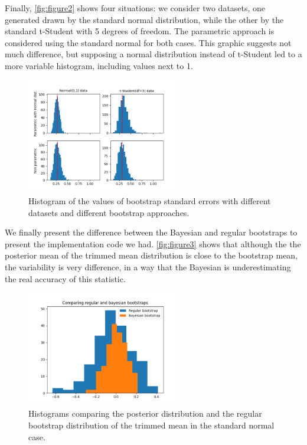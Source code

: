 \documentclass[a4paper,10pt, notitlepage]{report}
\begin{document}
Finally, \autoref{fig:figure2} shows four situations: we consider two
datasets, one generated drawn by the standard normal distribution, while the
other by the standard t-Student with 5 degrees of freedom. The parametric
approach is considered using the standard normal for both cases. This graphic
suggests not much difference, but supposing a normal distribution instead of
t-Student led to a more variable histogram, including values next to 1.

\begin{figure}[htb]
  \centering
  \includegraphics[width=0.6\textwidth]{parametric_bootstrap.png}
  \caption{\label{fig:figure2}Histogram of the values of bootstrap standard errors
  with different datasets and different bootstrap approaches.}
\end{figure}

We finally present the difference between the Bayesian and regular bootstraps
to present the implementation code we had. \autoref{fig:figure3} shows that
although the the posterior mean of the trimmed mean distribution is close to
the bootstrap mean, the variability is very difference, in a way that the
Bayesian is underestimating the real accuracy of this statistic.

\begin{figure}[htb]
  \centering
  \includegraphics[width=0.6\textwidth]{baysian-vs-bootstrap.png}
  \caption{\label{fig:figure3}Histograms comparing the posterior distribution
  and the regular bootstrap distribution of the trimmed mean in the standard
  normal case.}
\end{figure}
\end{document}
